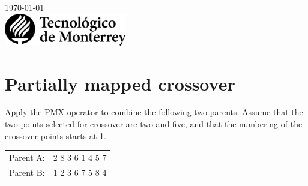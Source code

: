 \documentclass{article}
\begin{document}
\begin{titlepage}


    {\large \today}\\[2cm] %


    \includegraphics[width=0.4\textwidth,height=\textheight,keepaspectratio]{../Assets/logo-tec-negro.png} %


    \vfill %

\end{titlepage}
\section{Partially mapped crossover}
Apply the PMX operator to combine the following two parents. Assume that the two points selected for crossover are two and five, and that the numbering of the crossover points starts at 1.
\begin{table}[h]
    \centering
    \begin{tabular}{cc}
        Parent A: &2 8 3 6 1 4 5 7\\
        Parent B: &1 2 3 6 7 5 8 4
    \end{tabular}
\end{table}
\end{document}
